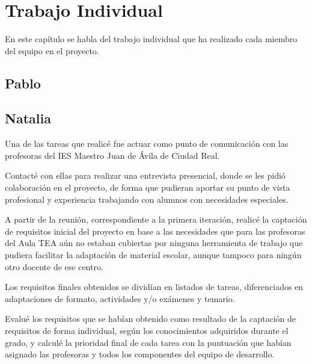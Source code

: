   
\setlength{\parskip}{\baselineskip}

\chapter{Trabajo Individual}

\begin{resumen}
	En este capítulo se habla del trabajo individual que ha realizado cada miembro del equipo en el proyecto.	
\end{resumen}
	
\section{Pablo}
\label{cap6:sec:pablo}

	
	
\section{Natalia}
\label{cap6:sec:natalia}
Una de las tareas que realicé fue actuar como punto de comunicación con las profesoras del IES Maestro Juan de Ávila de Ciudad Real. 

Contacté con ellas para realizar una entrevista presencial, donde se les pidió colaboración en el proyecto, de forma que pudieran aportar su punto de vista profesional y experiencia trabajando con alumnos con necesidades especiales.

A partir de la reunión, correspondiente a la primera iteración, realicé la captación de requisitos inicial del proyecto en base a las necesidades que para las profesoras del Aula TEA aún no estaban cubiertas por ninguna herramienta de trabajo que pudiera facilitar la adaptación de material escolar, aunque tampoco para ningún otro docente de ese centro.

Los requisitos finales obtenidos se dividían en listados de tareas, diferenciados en  adaptaciones de formato, actividades y/o exámenes y temario.

Evalué los requisitos que se habían obtenido como resultado de la captación de requisitos de forma individual, según los conocimientos adquiridos durante el grado, y calculé la prioridad final de cada tarea con la puntuación que habían asignado las profesoras y todos los componentes del equipo de desarrollo.

